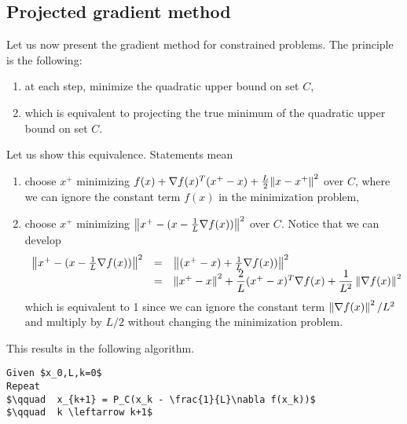 \subsection{Projected gradient method}
Let us now present the gradient method for constrained problems. The principle is the following:
\begin{enumerate}
\item at each step, minimize the quadratic upper bound on set $C$,
\item which is equivalent to projecting the true minimum of the quadratic upper bound on set $C$.
\end{enumerate}
Let us show this equivalence. Statements mean
\begin{enumerate}
\item choose $x^+$ minimizing $f(x) + \nabla f(x)^T(x^+-x) + \frac{L}{2}{\left\Vert x-x^+ \right\Vert}^2$ over $C$, where we can ignore the constant term $f(x)$ in the minimization problem,
\item choose $x^+$ minimizing ${\left\Vert x^+ - (x - \frac{1}{L}\nabla f(x)) \right\Vert^2}$ over $C$. Notice that we can develop
\begin{equation*}
\begin{array}{rcl}
\left\Vert x^+ - (x - \frac{1}{L}\nabla f(x)) \right\Vert^2 & = & \left\Vert (x^+ - x) + \frac{1}{L}\nabla f(x)) \right\Vert^2 \\
& = & \left\Vert x^+-x \right\Vert^2 + \dfrac{2}{L}(x^+-x)^T \nabla f(x) + \dfrac{1}{L^2} \left\Vert \nabla f(x) \right\Vert^2
\end{array}
\end{equation*}
which is equivalent to 1 since we can ignore the constant term $\left\Vert \nabla f(x) \right\Vert^2/L^2$ and multiply by $L/2$ without changing the minimization problem.
\end{enumerate}

This results in the following algorithm.

\begin{lstlisting}[mathescape,caption=Projected gradient method]
Given $x_0,L,k=0$ 
Repeat
$\qquad  x_{k+1} = P_C(x_k - \frac{1}{L}\nabla f(x_k))$
$\qquad  k \leftarrow k+1$
\end{lstlisting}


% 
